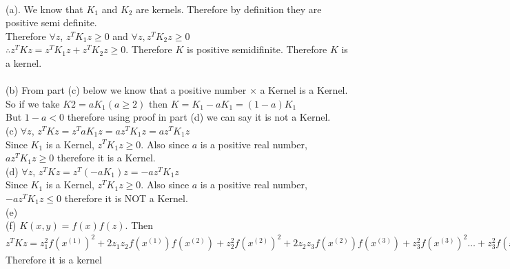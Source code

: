 \begin{answer}\\
(a). We know that $K_1$ and $K_2$ are kernels. Therefore by definition they are positive semi definite.\\
Therefore $\forall z$, $z^TK_1z \geq 0$ and $\forall z, z^TK_2z \geq 0$\\
$\therefore z^TKz = z^TK_1z+z^TK_2z \geq 0$. Therefore $K$ is positive semidifinite. Therefore $K$ is a kernel.\\
\\
(b) From part (c) below we know that a positive number $\times$ a Kernel is a Kernel. So if we take $K2=aK_1 (a \geq 2)$ then $K=K_1-aK_1=(1-a)K_1$\\
But $1-a <0$ therefore using proof in part (d) we can say it is not a Kernel.\\
(c) $\forall z$, $z^TKz=z^TaK_1z=az^TK_1z=az^TK_1z$\\
Since $K_1$ is a Kernel, $z^TK_1z \geq 0$. Also since $a$ is a positive real number, $az^TK_1z \geq 0$ therefore it is a Kernel.\\
(d) $\forall z$, $z^TKz=z^T(-aK_1)z=-az^TK_1z$\\
Since $K_1$ is a Kernel, $z^TK_1z \geq 0$. Also since $a$ is a positive real number, $-az^TK_1z \leq 0$ therefore it is NOT a Kernel.\\
(e) \\
(f) $K(x,y)=f(x)f(z)$. Then $z^TKz=z_1^2f(x^{(1)})^2+2z_1z_2f(x^{(1)})f(x^{(2)})+z_2^2f(x^{(2)})^2+2z_2z_3f(x^{(2)})f(x^{(3)})+z_3^2f(x^{(3)})^2 \dots +z_3^2f(x^{(3)})^2=(\sum_{i=1}^{m}u_i f(x^{(i)}))^2 \geq 0$\\
Therefore it is a kernel
\end{answer}